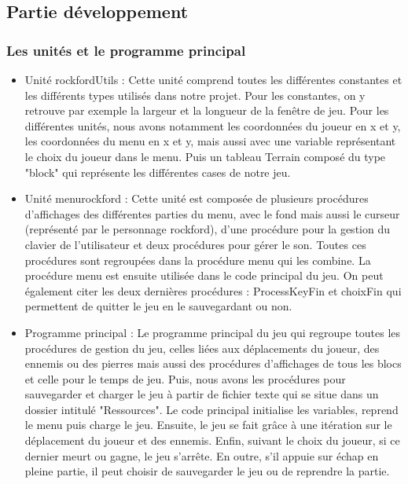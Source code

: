 \newpage
   
    \subsection{Partie développement}
        \subsubsection{Les unités et le programme principal}
            \begin{itemize}
                \item {Unité rockfordUtils} : Cette unité comprend toutes les différentes constantes et les différents types utilisés dans notre projet. Pour les constantes, on y retrouve par exemple la largeur et la longueur de la fenêtre de jeu. Pour les différentes unités, nous avons notamment les coordonnées du joueur en x et y, les coordonnées du menu en x et y, mais aussi avec une variable représentant le choix du joueur dans le menu. Puis un tableau Terrain composé du type "block" qui représente les différentes cases de notre jeu.
                \\
                \item {Unité menurockford} : Cette unité est composée de plusieurs procédures d'affichages des différentes parties du menu, avec le fond mais aussi le curseur (représenté par le personnage rockford), d'une procédure pour la gestion du clavier de l'utilisateur et deux procédures pour gérer le son. Toutes ces procédures sont regroupées dans la procédure menu qui les combine. La procédure menu est ensuite utilisée dans le code principal du jeu. On peut également citer les deux dernières procédures : ProcessKeyFin et choixFin qui permettent de quitter le jeu en le sauvegardant ou non.
                \\
                \item {Programme principal} : Le programme principal du jeu qui regroupe toutes les procédures de gestion du jeu, celles liées aux déplacements du joueur, des ennemis ou des pierres mais aussi des procédures d'affichages de tous les blocs et celle pour le temps de jeu. Puis, nous avons les procédures pour sauvegarder et charger le jeu à partir de fichier texte qui se situe dans un dossier intitulé "Ressources". Le code principal initialise les variables, reprend le menu puis charge le jeu. Ensuite, le jeu se fait grâce à une itération sur le déplacement du joueur et des ennemis. Enfin, suivant le choix du joueur, si ce dernier meurt ou gagne, le jeu s'arrête. En outre, s'il appuie sur échap en pleine partie, il peut choisir de sauvegarder le jeu ou de reprendre la partie.
            \end{itemize}
        
